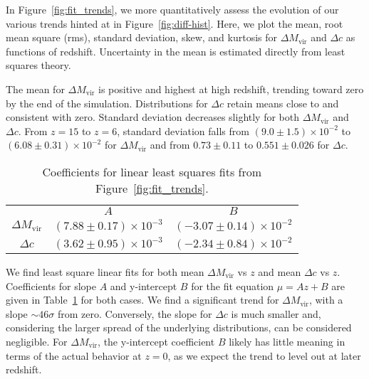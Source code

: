 In Figure~\ref{fig:fit_trends}, we more quantitatively assess the evolution of our various trends hinted at in Figure~\ref{fig:diff-hist}.  Here, we plot the mean, root mean square (rms), standard deviation, skew, and kurtosis for $\Delta M_{\mathrm{vir}}$ and $\Delta c$ as functions of redshift.  Uncertainty in the mean is estimated directly from least squares theory.

The mean for $\Delta M_{\mathrm{vir}}$ is positive and highest at high redshift, trending toward zero by the end of the simulation.  Distributions for $\Delta c$ retain means close to and consistent with zero.  Standard deviation decreases slightly for both $\Delta M_{\mathrm{vir}}$ and $\Delta c$.  From $z = 15$ to $z = 6$, standard deviation falls from $(9.0 \pm 1.5) \times 10^{-2}$ to $(6.08 \pm 0.31) \times 10^{-2}$ for $\Delta M_{\mathrm{vir}}$ and from $0.73 \pm 0.11$ to $0.551 \pm 0.026$ for $\Delta c$.

\begin{table}[t]
	\centering
	\caption{Coefficients for linear least squares fits from Figure~\ref{fig:fit_trends}.}
	\begin{tabular}{ c  r  r }
		\toprule
		                           &  \multicolumn{1}{c}{$A$}             &  \multicolumn{1}{c}{$B$} \\
		\cmidrule(l){2-3}
		$\Delta M_{\mathrm{vir}}$  &  $(7.88 \pm 0.17) \times 10^{-3}$  &  $(-3.07 \pm 0.14) \times 10^{-2}$ \\
		$\Delta c$                 &  $(3.62 \pm 0.95) \times 10^{-3}$  &  $(-2.34 \pm 0.84) \times 10^{-2}$ \\
		\bottomrule
	\end{tabular}
	\label{tab:coeffs}
\end{table}

We find least square linear fits for both mean $\Delta M_{\mathrm{vir}}$ vs $z$ and mean $\Delta c$ vs $z$.  Coefficients for slope $A$ and y-intercept $B$ for the fit equation $\mu = A z + B$ are given in Table~\ref{tab:coeffs} for both cases.  We find a significant trend for $\Delta M_{\mathrm{vir}}$, with a slope $\sim 46 \sigma$ from zero.  Conversely, the slope for $\Delta c$ is much smaller and, considering the larger spread of the underlying distributions, can be considered negligible.  For $\Delta M_{\mathrm{vir}}$, the y-intercept coefficient $B$ likely has little meaning in terms of the actual behavior at $z = 0$, as we expect the trend to level out at later redshift.

